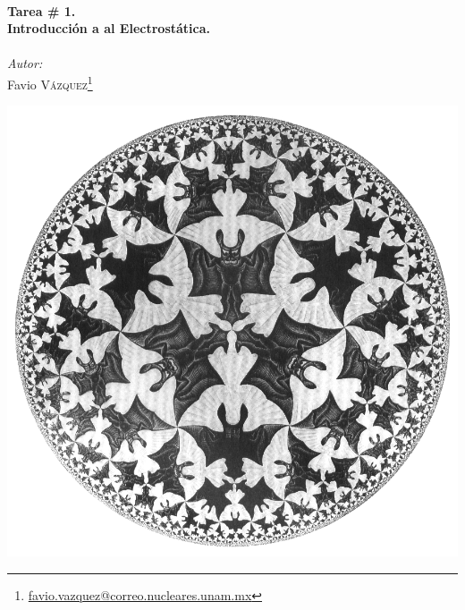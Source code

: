 \documentclass[a4paper,11pt]{article}
\numberwithin{equation}{section}
\begin{document}
\begin{titlepage}

\HRule \\[0.4cm]
{ \huge \bfseries Tarea \# 1. \\ Introducción a al 
Electrostática.}\\[0.2cm] %
\HRule \\[0.2cm]
 
\setcounter{footnote}{0}
\center
\large
\emph{Autor:} \\ %
\Large Favio \textsc{Vázquez}\footnote[1]{\href{mailto:favio.vazquez@correo.nucleares.unam.mx}{favio.vazquez@correo.nucleares.unam.mx}}


\includegraphics[scale=0.35]{angelsDemonsEscher}


\vfill %

\end{titlepage}
\end{document}
